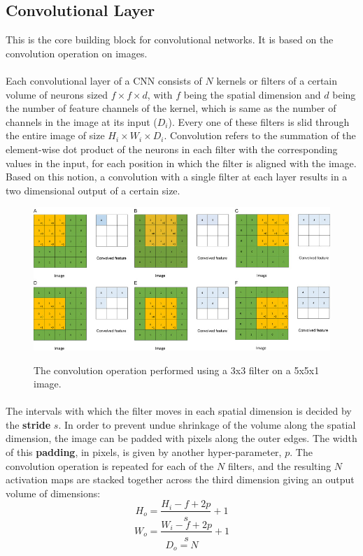 \documentclass[12pt, a4paper]{report}
\begin{document}
\subsection{Convolutional Layer}
This is the core building block for convolutional networks. It is based on the convolution operation on images.
\paragraph{}
Each convolutional layer of a CNN consists of $N$ kernels or filters of a certain volume of neurons sized $f \times f \times d$, with $f$ being the spatial dimension and $d$ being the number of feature channels of the kernel, which is same as the number of channels in the image at its input ($D_{i}$). Every one of these filters is slid through the entire image of size $H_{i} \times W_{i} \times D_{i}$. Convolution refers to the summation of the element-wise dot product of the neurons in each filter with the corresponding values in the input, for each position in which the filter is aligned with the image. Based on this notion, a convolution with a single filter at each layer results in a two dimensional output of a certain size. \cite{cs231n, muruganandham2016semantic, dlai4}
\begin{figure}[h]
\centering
\includegraphics[width=\textwidth]{cnn1.jpg}
\caption{The convolution operation performed using a 3x3 filter on a 5x5x1 image.}\cite{fathi2018deep}
\end{figure}
\paragraph{}
The intervals with which the filter moves in each spatial dimension is decided by the \textbf{stride} $s$. In order to prevent undue shrinkage of the volume along the spatial dimension, the image can be padded with pixels along the outer edges. The width of this \textbf{padding}, in pixels, is given by another hyper-parameter, $p$.\cite{dlai4, muruganandham2016semantic} The convolution operation is repeated for each of the $N$ filters, and the resulting $N$ activation maps are stacked together across the third dimension giving an output volume of dimensions:\\
\begin{displaymath}
H_{o}=\frac{H_{i}-f+2p}{s}+1
\end{displaymath}
\begin{displaymath}
W_{o}=\frac{W_{i}-f+2p}{s}+1
\end{displaymath}
\begin{displaymath}
D_{o}=N
\end{displaymath}
\end{document}
